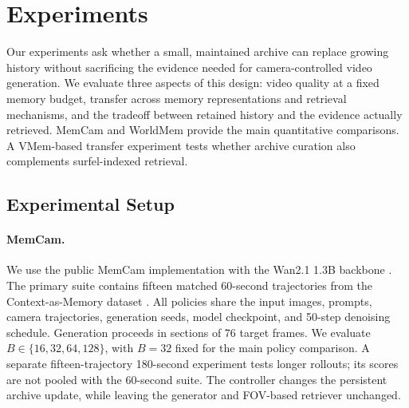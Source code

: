 
\providecommand{\Geo}{\textsc{GeoCov}}
\providecommand{\RI}{\textsc{RI}}
\providecommand{\TBD}{\textbf{TBD}}

\section{Experiments}
\label{sec:experimental-results}

Our experiments ask whether a small, maintained archive can replace growing
history without sacrificing the evidence needed for camera-controlled video
generation. We evaluate three aspects of this design: video quality at a fixed
memory budget, transfer across memory representations and retrieval mechanisms,
and the tradeoff between retained history and the evidence actually retrieved.
MemCam and WorldMem provide the main quantitative comparisons. A VMem-based
transfer experiment tests whether archive curation also complements
surfel-indexed retrieval.

\subsection{Experimental Setup}
\label{sec:exp-protocol}

\paragraph{MemCam.}
We use the public MemCam implementation with the Wan2.1 1.3B backbone
\citep{memcam,wan}. The primary suite contains fifteen matched 60-second
trajectories from the Context-as-Memory dataset \citep{contextasmemory}.
All policies share the input images, prompts, camera trajectories, generation
seeds, model checkpoint, and 50-step denoising schedule. Generation proceeds
in sections of 76 target frames. We evaluate $B\in\{16,32,64,128\}$, with
$B=32$ fixed for the main policy comparison. A separate fifteen-trajectory
180-second experiment tests longer rollouts; its scores are not pooled with
the 60-second suite. The controller changes the persistent archive update,
while leaving the generator and FOV-based retriever unchanged.

